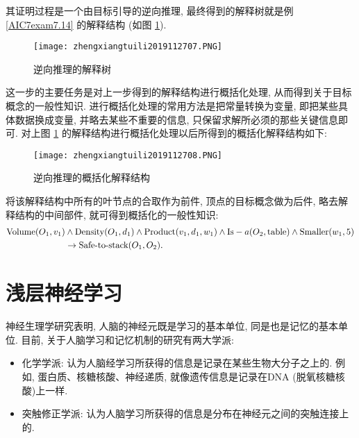 其证明过程是一个由目标引导的逆向推理, 最终得到的解释树就是例  \ref{AIC7exam7.14} 的解释结构 (如图 \ref{AI32fig2707}).
\begin{figure}[H]
\centering
\texttt{[image: zhengxiangtuili2019112707.PNG]}
\caption{逆向推理的解释树}
\label{AI32fig2707}
\vspace{-0.3cm}
\end{figure}

这一步的主要任务是对上一步得到的解释结构进行概括化处理, 从而得到关于目标概念的一般性知识.
     进行概括化处理的常用方法是把常量转换为变量, 即把某些具体数据换成变量, 并略去某些不重要的信息, 只保留求解所必须的那些关键信息即可.
     对上图 \ref{AI32fig2707} 的解释结构进行概括化处理以后所得到的概括化解释结构如下:
\begin{figure}[H]
    \centering
    \texttt{[image: zhengxiangtuili2019112708.PNG]}
    \caption{逆向推理的概括化解释结构}
    \label{AI32fig2708}
    \vspace{-0.3cm}
\end{figure}
 将该解释结构中所有的叶节点的合取作为前件, 顶点的目标概念做为后件, 略去解释结构的中间部件, 就可得到概括化的一般性知识:
\begin{align}
  \textup{Volume} (O_1,v_1)&\wedge \textup{Density} (O_1,d_1)\wedge \textup{Product} (v_1,d_1,w_1)\wedge \textup{Is}-a (O_2,\textup{table})\wedge\textup{Smaller} (w_1,5)\notag\\
                          &\rightarrow \textup{Safe-to-stack} (O_1,O_2).
\end{align}
\section{浅层神经学习}

神经生理学研究表明, 人脑的神经元既是学习的基本单位, 同是也是记忆的基本单位. 目前, 关于人脑学习和记忆机制的研究有两大学派:
\begin{itemize}
    \item 化学学派: 认为人脑经学习所获得的信息是记录在某些生物大分子之上的. 例如, 蛋白质、核糖核酸、神经递质, 就像遗传信息是记录在DNA (脱氧核糖核酸)上一样.
    \item 突触修正学派: 认为人脑学习所获得的信息是分布在神经元之间的突触连接上的.
\end{itemize}

